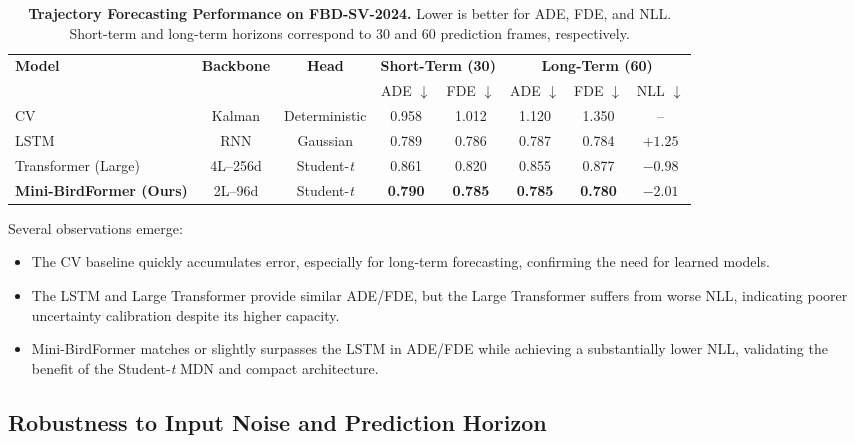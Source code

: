 \documentclass[journal]{IEEEtran}
\begin{document}
\begin{table}[t]
	\centering
	\caption{\textbf{Trajectory Forecasting Performance on FBD-SV-2024.} Lower is better for ADE, FDE, and NLL. Short-term and long-term horizons correspond to 30 and 60 prediction frames, respectively.}
	\label{tab:main_results}
	\setlength{\tabcolsep}{8pt}
	\begin{tabular}{l|c|c|cc|ccc}
		\toprule
		\multirow{2}{*}{\textbf{Model}} &
		\multirow{2}{*}{\textbf{Backbone}} &
		\multirow{2}{*}{\textbf{Head}} &
		\multicolumn{2}{c|}{\textbf{Short-Term (30)}} &
		\multicolumn{3}{c}{\textbf{Long-Term (60)}} \\
		\cline{4-8}
		& & & ADE $\downarrow$ & FDE $\downarrow$ & ADE $\downarrow$ & FDE $\downarrow$ & NLL $\downarrow$ \\
		\midrule
		CV & Kalman & Deterministic & 0.958 & 1.012 & 1.120 & 1.350 & -- \\
		LSTM \cite{Alahi2016SocialLSTM} & RNN & Gaussian & 0.789 & 0.786 & 0.787 & 0.784 & $+1.25$ \\
		Transformer (Large) \cite{Giuliari2021Transformer} & 4L--256d & Student-\textit{t} & 0.861 & 0.820 & 0.855 & 0.877 & $-0.98$ \\
		\midrule
		\rowcolor{gray10}
		\textbf{Mini-BirdFormer (Ours)} & 2L--96d & Student-\textit{t} & \textbf{0.790} & \textbf{0.785} & \textbf{0.785} & \textbf{0.780} & \textbf{$-2.01$} \\
		\bottomrule
	\end{tabular}
\end{table}

Several observations emerge:

\begin{itemize}
	\item The CV baseline quickly accumulates error, especially for long-term forecasting, confirming the need for learned models.
	\item The LSTM and Large Transformer provide similar ADE/FDE, but the Large Transformer suffers from worse NLL, indicating poorer uncertainty calibration despite its higher capacity.
	\item Mini-BirdFormer matches or slightly surpasses the LSTM in ADE/FDE while achieving a substantially lower NLL, validating the benefit of the Student-\textit{t} MDN and compact architecture.
\end{itemize}

\subsection{Robustness to Input Noise and Prediction Horizon}
\end{document}
